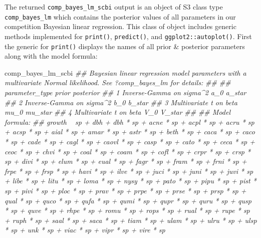 \documentclass[12pt]{article}
\newenvironment{Shaded}{\begin{snugshade}}{\end{snugshade}}
\newcommand{\AlertTok}[1]{\textcolor[rgb]{0.94,0.16,0.16}{#1}}
\newcommand{\CommentTok}[1]{\textcolor[rgb]{0.56,0.35,0.01}{\textit{#1}}}
\newcommand{\DataTypeTok}[1]{\textcolor[rgb]{0.13,0.29,0.53}{#1}}
\newcommand{\KeywordTok}[1]{\textcolor[rgb]{0.13,0.29,0.53}{\textbf{#1}}}
\newcommand{\NormalTok}[1]{#1}
\newcommand{\OperatorTok}[1]{\textcolor[rgb]{0.81,0.36,0.00}{\textbf{#1}}}
\newcommand{\OtherTok}[1]{\textcolor[rgb]{0.56,0.35,0.01}{#1}}
\newcommand{\StringTok}[1]{\textcolor[rgb]{0.31,0.60,0.02}{#1}}
\begin{document}
\begin{Shaded}
\end{Shaded}

The returned \texttt{comp\_bayes\_lm\_scbi} output is an object of S3
class type \texttt{comp\_bayes\_lm} which contains the posterior values
of all parameters in our competition Bayesian linear regression. This
class of object includes generic methods implemented for
\texttt{print()}, \texttt{predict()}, and \texttt{ggplot2::autoplot()}.
First the generic for \texttt{print()} displays the names of all prior
\& posterior parameters along with the model formula:

\begin{Shaded}
\begin{Highlighting}[]
\NormalTok{comp_bayes_lm_scbi}
\CommentTok{## Bayesian linear regression model parameters with a multivariate Normal likelihood. See ?comp_bayes_lm for details:}
\CommentTok{## }
\CommentTok{##   parameter_type           prior posterior}
\CommentTok{## 1 Inverse-Gamma on sigma^2 a_0   a_star   }
\CommentTok{## 2 Inverse-Gamma on sigma^2 b_0   b_star   }
\CommentTok{## 3 Multivariate t on beta   mu_0  mu_star  }
\CommentTok{## 4 Multivariate t on beta   V_0   V_star   }
\CommentTok{## }
\CommentTok{## Model formula:}
\CommentTok{## growth ~ sp + dbh + dbh * sp + acne * sp + acpl * sp + acru * sp + acsp * sp + aial * sp + amar * sp + astr * sp + beth * sp + caca * sp + caco * sp + cade * sp + cagl * sp + caovl * sp + casp * sp + cato * sp + ceca * sp + ceoc * sp + chvi * sp + coal * sp + coam * sp + cofl * sp + crpr * sp + crsp * sp + divi * sp + elum * sp + eual * sp + fagr * sp + fram * sp + frni * sp + frpe * sp + frsp * sp + havi * sp + ilve * sp + juci * sp + juni * sp + juvi * sp + libe * sp + litu * sp + loma * sp + nysy * sp + pato * sp + pipu * sp + pist * sp + pivi * sp + ploc * sp + prav * sp + prpe * sp + prse * sp + prsp * sp + qual * sp + quco * sp + qufa * sp + qumi * sp + qupr * sp + quru * sp + qusp * sp + quve * sp + rhpe * sp + romu * sp + rops * sp + rual * sp + rupe * sp + ruph * sp + saal * sp + saca * sp + tiam * sp + ulam * sp + ulru * sp + ulsp * sp + unk * sp + viac * sp + vipr * sp + vire * sp}
\end{Highlighting}
\end{Shaded}
\end{document}
